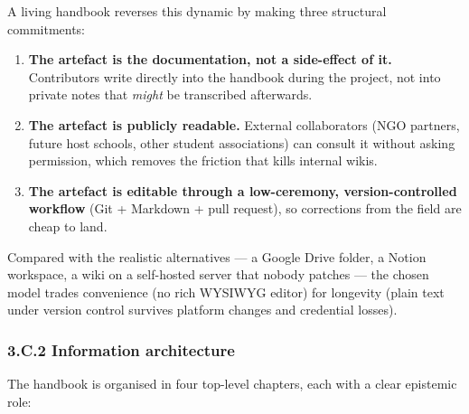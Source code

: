 A living handbook reverses this dynamic by making three structural
commitments:

\begin{enumerate}
\def\labelenumi{\arabic{enumi}.}
\tightlist
\item
  \textbf{The artefact is the documentation, not a side-effect of it.}
  Contributors write directly into the handbook during the project, not
  into private notes that \emph{might} be transcribed afterwards.
\item
  \textbf{The artefact is publicly readable.} External collaborators
  (NGO partners, future host schools, other student associations) can
  consult it without asking permission, which removes the friction that
  kills internal wikis.
\item
  \textbf{The artefact is editable through a low-ceremony,
  version-controlled workflow} (Git + Markdown + pull request), so
  corrections from the field are cheap to land.
\end{enumerate}

Compared with the realistic alternatives --- a Google Drive folder, a
Notion workspace, a wiki on a self-hosted server that nobody patches ---
the chosen model trades convenience (no rich WYSIWYG editor) for
longevity (plain text under version control survives platform changes
and credential losses).

\hypertarget{c.2-information-architecture}{%
\subsubsection{3.C.2 Information
architecture}\label{c.2-information-architecture}}

The handbook is organised in four top-level chapters, each with a clear
epistemic role:

